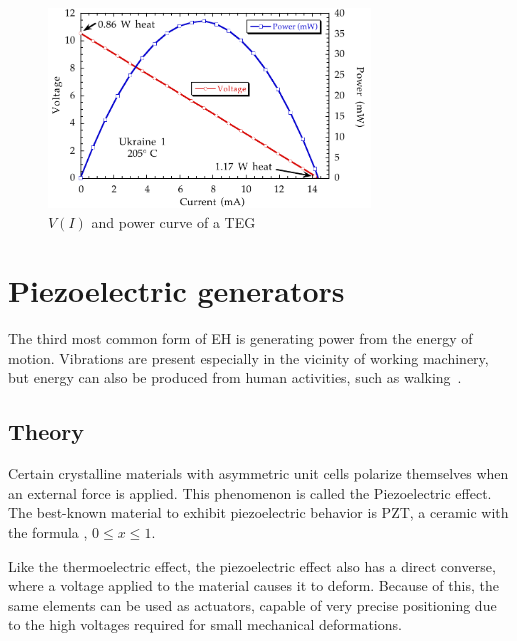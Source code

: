 \documentclass[a4paper,10pt]{article}
\begin{document}
\begin{figure}[h]
\centering
 \includegraphics[height=150pt]{./Slike/TEG-curve}
\caption{$V(I)$ and power curve of a \ac{TEG}~\cite{teg-curve}}
\label{fig:teg-curve}
\end{figure}

\section{Piezoelectric generators}

The third most common form of \ac{EH} is generating power from the energy of motion. Vibrations are present especially in the vicinity of working machinery, but energy can also be produced from human activities, such as walking~\cite{piezo-shoe-ieee}. 

\subsection{Theory}

Certain crystalline materials with asymmetric unit cells polarize themselves when an external force is applied. This phenomenon is called the Piezoelectric effect. The best-known material to exhibit piezoelectric behavior is \ac{PZT}, a ceramic with the formula , $0\leq x \leq 1$.

Like the thermoelectric effect, the piezoelectric effect also has a direct converse, where a voltage applied to the material causes it to deform. Because of this, the same elements can be used as actuators, capable of very precise positioning due to the high voltages required for small mechanical deformations. 
\end{document}
